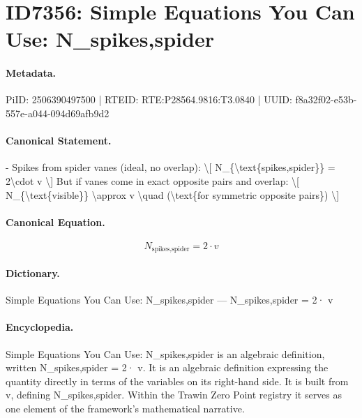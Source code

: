 \section*{ID7356: Simple Equations You Can Use: N\_spikes,spider}
\paragraph{Metadata.}
PiID: 2506390497500 | RTEID: RTE:P28564.9816:T3.0840 | UUID: f8a32f02-e53b-557e-a044-094d69afb9d2

\paragraph{Canonical Statement.}
- Spikes from spider vanes (ideal, no overlap): \textbackslash{}[ N\_\{\textbackslash{}text\{spikes,spider\}\} = 2\textbackslash{}cdot v \textbackslash{}] But if vanes come in exact opposite pairs and overlap: \textbackslash{}[ N\_\{\textbackslash{}text\{visible\}\} \textbackslash{}approx v \textbackslash{}quad (\textbackslash{}text\{for symmetric opposite pairs\}) \textbackslash{}]

\paragraph{Canonical Equation.}
\[
N_{\text{spikes,spider}} = 2\cdot v
\]

\paragraph{Dictionary.}
Simple Equations You Can Use: N\_spikes,spider — N\_spikes,spider = 2· v

\paragraph{Encyclopedia.}
Simple Equations You Can Use: N\_spikes,spider is an algebraic definition, written N\_spikes,spider = 2· v. It is an algebraic definition expressing the quantity directly in terms of the variables on its right-hand side. It is built from v, defining N\_spikes,spider. Within the Trawin Zero Point registry it serves as one element of the framework's mathematical narrative.
